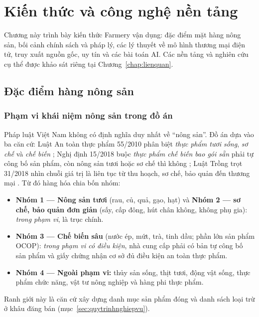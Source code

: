 \chapter{Kiến thức và công nghệ nền tảng}
\label{chap:coso}

Chương này trình bày kiến thức Farmery vận dụng: đặc điểm mặt hàng nông sản, bối cảnh chính sách và pháp lý, các lý thuyết về mô hình thương mại điện tử, truy xuất nguồn gốc, uy tín và các bài toán AI. Các nền tảng và nghiên cứu cụ thể được khảo sát riêng tại Chương~\ref{chap:lienquan}.

\section{Đặc điểm hàng nông sản}
\label{sec:dacdiemnongsan}

\subsection{Phạm vi khái niệm nông sản trong đồ án}
\label{subsec:dinhnghianongsan}

Pháp luật Việt Nam không có định nghĩa duy nhất về ``nông sản''. Đồ án dựa vào ba căn cứ: Luật An toàn thực phẩm 55/2010 phân biệt \emph{thực phẩm tươi sống}, \emph{sơ chế} và \emph{chế biến} \parencite{luat_attp_2010}; Nghị định 15/2018 buộc \emph{thực phẩm chế biến bao gói sẵn} phải tự công bố sản phẩm, còn nông sản tươi hoặc sơ chế thì không \parencite{nd15_2018}; Luật Trồng trọt 31/2018 nhìn chuỗi giá trị là liên tục từ thu hoạch, sơ chế, bảo quản đến thương mại \parencite{luat_trongtrot_2018}. Từ đó hàng hóa chia bốn nhóm:
\begin{itemize}
    \item \textbf{Nhóm 1 --- Nông sản tươi} (rau, củ, quả, gạo, hạt) và \textbf{Nhóm 2 --- sơ chế, bảo quản đơn giản} (sấy, cấp đông, hút chân không, không phụ gia): \emph{trong phạm vi}, là trục chính.
    \item \textbf{Nhóm 3 --- Chế biến sâu} (nước ép, mứt, trà, tinh dầu; phần lớn sản phẩm OCOP): \emph{trong phạm vi có điều kiện}, nhà cung cấp phải có bản tự công bố sản phẩm và giấy chứng nhận cơ sở đủ điều kiện an toàn thực phẩm.
    \item \textbf{Nhóm 4 --- Ngoài phạm vi:} thủy sản sống, thịt tươi, động vật sống, thực phẩm chức năng, vật tư nông nghiệp và hàng phi thực phẩm.
\end{itemize}
Ranh giới này là căn cứ xây dựng danh mục sản phẩm đóng và danh sách loại trừ ở khâu đăng bán (mục~\ref{sec:quytrinhnghiepvu}).

